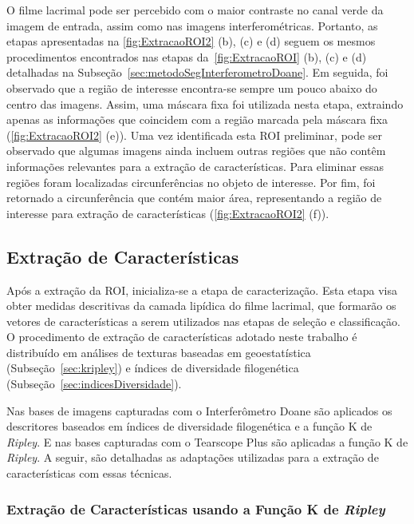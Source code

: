 O filme lacrimal pode ser percebido com o maior contraste no canal verde da imagem de entrada, assim como nas imagens interferométricas. Portanto, as etapas apresentadas na \autoref{fig:ExtracaoROI2} (b), (c) e (d) seguem os mesmos procedimentos encontrados nas etapas da~\autoref{fig:ExtracaoROI} (b), (c) e (d) detalhadas na Subseção~\ref{sec:metodoSegInterferometroDoane}. Em seguida, foi observado que a região de interesse encontra-se sempre um pouco abaixo do centro das imagens. Assim, uma máscara fixa foi utilizada nesta etapa, extraindo apenas as informações que coincidem com a região marcada pela máscara fixa (\autoref{fig:ExtracaoROI2} (e)). Uma vez identificada esta ROI preliminar, pode ser observado que algumas imagens ainda incluem outras regiões que não contêm informações relevantes para a extração de características. Para eliminar essas regiões foram localizadas circunferências no objeto de interesse. Por fim, foi retornado a circunferência que contém maior área, representando a região de interesse para extração de características (\autoref{fig:ExtracaoROI2} (f)).

\subsection{Extração de Características}
\label{sec:metodoExtracao}

Após a extração da ROI, inicializa-se a etapa de caracterização. Esta etapa visa obter medidas descritivas da camada lipídica do filme lacrimal, que formarão os vetores de características a serem utilizados nas etapas de seleção e classificação. O procedimento de extração de características adotado neste trabalho é distribuído em análises de texturas baseadas em geoestatística (Subseção~\ref{sec:kripley}) e índices de diversidade filogenética (Subseção~\ref{sec:indicesDiversidade}). %

Nas bases de imagens capturadas com o Interferômetro Doane são aplicados os descritores baseados em índices de diversidade filogenética e a função K de \textit{Ripley}. E nas bases capturadas com o Tearscope Plus são aplicadas a função K de \textit{Ripley}. A seguir, são detalhadas as adaptações utilizadas para a extração de características com essas técnicas.

\subsubsection{Extração de Características usando a Função K de \textit{Ripley}}
\label{sec:metodoRipley}


